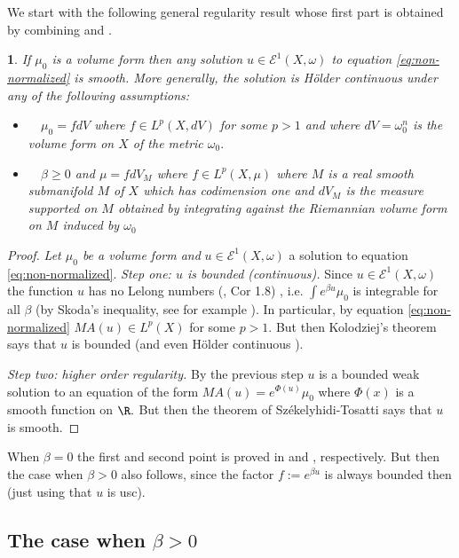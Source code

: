 \documentclass[11pt,oneside,english]{amsart}
\numberwithin{equation}{section}
\numberwithin{figure}{section}
\theoremstyle{plain}
\theoremstyle{plain}
\theoremstyle{plain}
\theoremstyle{plain}
\newtheorem{prop}[thm]{\protect\propositionname}
\theoremstyle{remark}
\theoremstyle{definition}
\providecommand{\propositionname}{Proposition}
\begin{document}
We start with the following general regularity result whose first
part is obtained by combining \cite{ko} and \cite{sz-to}. 
\begin{prop}
\label{pro:reg}If $\mu_{0}$ is a volume form then any solution $u\in\mathcal{E}^{1}(X,\omega)$
to equation \ref{eq:non-normalized} is smooth. More generally, the
solution is Hölder continuous under any of the following assumptions: 
\begin{itemize}
\item \cite{ko2}~~$\mu_{0}=fdV$ where $f\in L^{p}(X,dV)$ for some $p>1$
and where $dV=\omega_{0}^{n}$ is the volume form on $X$ of the metric
$\omega_{0}.$ 
\item \cite{hi}~~$\beta\geq0$ and $\mu=fdV_{M}$ where $f\in L^{p}(X,\mu)$
where $M$ is a real smooth submanifold $M$ of $X$ which has codimension
one and $dV_{M}$ is the measure supported on $M$ obtained by integrating
against the Riemannian volume form on $M$ induced by $\omega_{0}$ 
\end{itemize}
\end{prop}
\begin{proof}
\emph{Let $\mu_{0}$ be a volume form and }$u\in\mathcal{E}^{1}(X,\omega)$
a solution to equation \ref{eq:non-normalized}.\emph{ Step one: $u$
is bounded (continuous). }Since $u\in\mathcal{E}^{1}(X,\omega)$ the
function $u$ has no Lelong numbers (\cite{g-z2}, Cor 1.8) , i.e.
$\int e^{\beta u}\mu_{0}$ is integrable for all $\beta$ (by Skoda's
inequality, see for example \cite{d-j}). In particular, by equation
\ref{eq:non-normalized} $MA(u)\in L^{p}(X)$ for some $p>1.$ But
then Kolodziej's theorem \cite{ko} says that $u$ is bounded (and
even Hölder continuous \cite{ko2}).

\emph{Step two: higher order regularity. }By the previous step $u$
is a bounded weak solution to an equation of the form $MA(u)=e^{\Phi(u)}\mu_{0}$
where $\Phi(x)$ is a smooth function on $\R.$ But then the theorem
of Székelyhidi-Tosatti \cite{sz-to} says that $u$ is smooth. 
\end{proof}
When $\beta=0$ the first and second point is proved in \cite{ko2}
and \cite{hi}, respectively. But then the case when $\beta>0$ also
follows, since the factor $f:=e^{\beta u}$ is always bounded then
(just using that $u$ is usc).

\subsection{The case when $\beta>0$}
\end{document}
